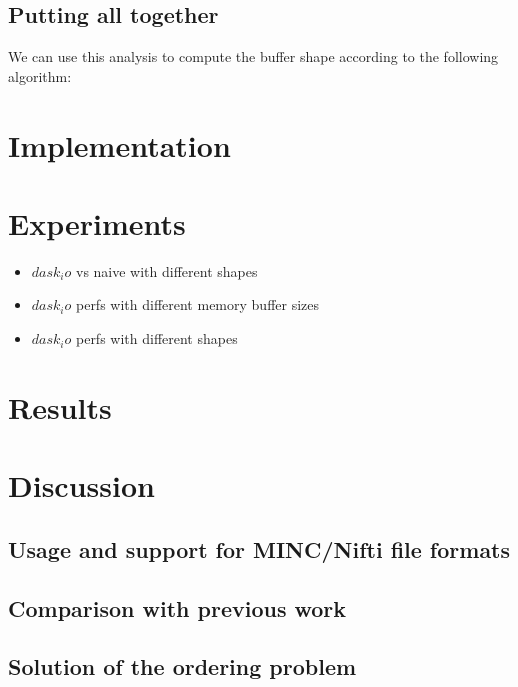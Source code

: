 \documentclass[conference]{IEEEtran}
\begin{document}
\subsection{Putting all together}
We can use this analysis to compute the buffer shape according to the following algorithm:

\section*{Implementation}

\section*{Experiments}

\begin{itemize}
  \item $dask_io$ vs naive with different shapes
  \item $dask_io$ perfs with different memory buffer sizes
  \item $dask_io$ perfs with different shapes
\end{itemize}

\section*{Results}

\section*{Discussion}

\subsection{Usage and support for MINC/Nifti file formats}
\subsection{Comparison with previous work}
\subsection{Solution of the ordering problem}
\end{document}
